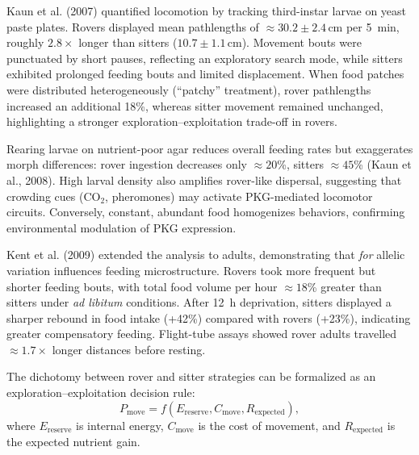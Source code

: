 \documentclass[11pt]{article}
\begin{document}
Kaun et al. (2007) quantified locomotion by tracking third-instar larvae on yeast paste plates. Rovers displayed mean pathlengths of $\approx 30.2 \pm 2.4$\,cm per 5~min, roughly $2.8 \times$ longer than sitters ($10.7 \pm 1.1$\,cm). Movement bouts were punctuated by short pauses, reflecting an exploratory search mode, while sitters exhibited prolonged feeding bouts and limited displacement. When food patches were distributed heterogeneously (``patchy'' treatment), rover pathlengths increased an additional 18\%, whereas sitter movement remained unchanged, highlighting a stronger exploration--exploitation trade-off in rovers.

Rearing larvae on nutrient-poor agar reduces overall feeding rates but exaggerates morph differences: rover ingestion decreases only $\approx 20$\%, sitters $\approx 45$\% (Kaun et al., 2008). High larval density also amplifies rover-like dispersal, suggesting that crowding cues (CO$_2$, pheromones) may activate PKG-mediated locomotor circuits. Conversely, constant, abundant food homogenizes behaviors, confirming environmental modulation of PKG expression.

Kent et al. (2009) extended the analysis to adults, demonstrating that \emph{for} allelic variation influences feeding microstructure. Rovers took more frequent but shorter feeding bouts, with total food volume per hour $\approx 18$\% greater than sitters under \emph{ad libitum} conditions. After 12~h deprivation, sitters displayed a sharper rebound in food intake (+42\%) compared with rovers (+23\%), indicating greater compensatory feeding. Flight-tube assays showed rover adults travelled $\approx 1.7 \times$ longer distances before resting.

The dichotomy between rover and sitter strategies can be formalized as an exploration--exploitation decision rule:
\begin{equation}
P_{\text{move}} = f(E_{\text{reserve}}, C_{\text{move}}, R_{\text{expected}}),
\end{equation}
where $E_{\text{reserve}}$ is internal energy, $C_{\text{move}}$ is the cost of movement, and $R_{\text{expected}}$ is the expected nutrient gain.
\end{document}
